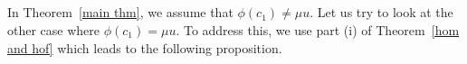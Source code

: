 \documentclass{amsart}
\newcommand{\thmref}[1]{Theorem~\ref{#1}}
\begin{document}
	
	
	\subsection{} In \thmref{main thm}, we assume that $\phi(c_1) \neq \mu u$. Let us try to look at the %
other case where $\phi(c_1) = \mu u$. To address this, we use part (i) of \thmref{hom and hof} which leads to the following proposition.
	
\end{document}
